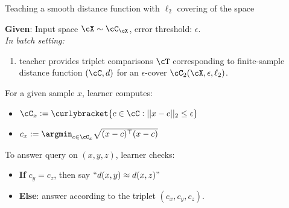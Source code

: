 \begin{algorithm}[t]
\caption{Teaching a smooth distance function with $\ell_2$ covering of the space}
\label{alg: smoothdistl2}
\textbf{Given}: Input space $\cX \sim \cC_{\cX}$, error threshold: $\epsilon$.\\
\vspace{1mm}
\textit{In batch setting:}\vspace{1mm}
\begin{enumerate}
    \item teacher provides triplet comparisons $\cT$ corresponding to finite-sample distance function $(\cC, d)$ for an $\epsilon$-cover $\cC_2(\cX,\epsilon,\ell_2)$.
\end{enumerate}
For a given sample $x$, learner computes:
\begin{itemize}
    \item $\cC_x := \curlybracket{c \in \cC: ||x - c ||_2 \le \epsilon}$ 
    \item $c_x := \argmin_{c \in \cC_x} \sqrt{(x-c)^{\top}(x-c)}$
\end{itemize}
\vspace{1mm}
To answer query on $(x,y,z)$, learner checks:
\begin{itemize}
    \item \textbf{If} $c_y = c_z$, then say $``d(x,y) \approx d(x,z)"$
    \item \textbf{Else}: answer according to the triplet $(c_x,c_y,c_z)$.
\end{itemize}
\end{algorithm}

